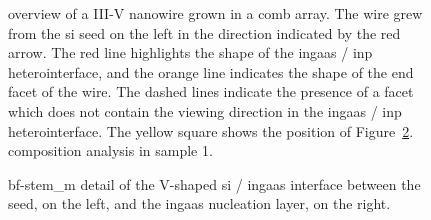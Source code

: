 \begin{figure}
{    }
    \caption[Overview, composition analysis, and detail of the seed/\acs{ingaas} interface in sample 1.]{ overview of a III-V nanowire grown in a comb array. The wire grew from the \acs{si} seed on the left in the direction indicated by the red arrow. The red line highlights the shape of the \acs{ingaas} / \acs{inp} heterointerface, and the orange line indicates the shape of the end facet of the wire. The dashed lines indicate the presence of a facet which does not contain the viewing direction in the \acs{ingaas} / \acs{inp} heterointerface. The yellow square shows the position of Figure~\ref{subfig:si-ingaas_s1}. composition analysis   in sample 1.}
    \label{fig:sample1}
\end{figure}

\begin{figure}
    \centering
    \caption[\acs{bf}-\acs{stem_m} detail of the V-shaped \acs{si} / \acs{ingaas} interface.]{\acs{bf}-\acs{stem_m} detail of the V-shaped \acs{si} / \acs{ingaas} interface between the seed, on the left, and the \acs{ingaas} nucleation layer, on the right.}
    \label{subfig:si-ingaas_s1}
\end{figure}

